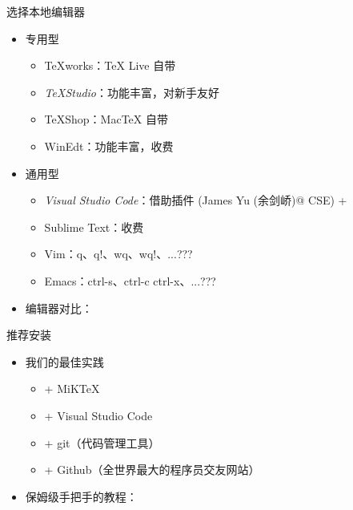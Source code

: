 \begin{frame}{选择本地编辑器}
    \begin{itemize}
      \item<+-> 专用型
    
        \begin{itemize}
          \item TeXworks：\TeX{} Live 自带 \faWindows{} \faApple{} \faLinux{}
          \item \emph{TeXStudio}：功能丰富，对新手友好 \faWindows{} \faApple{} \faLinux{}
          \item TeXShop：Mac\TeX{} 自带 \faApple{}
          \item WinEdt：功能丰富，收费 \faWindows{}
        \end{itemize}
    
      \item<+-> 通用型
    
        \begin{itemize}
          \item \emph{Visual Studio Code}：借助插件  (James Yu (余剑峤)@ CSE) + 
          \item Sublime Text：收费
          \item Vim：q、q!、wq、wq!、...???
          \item Emacs：ctrl-s、ctrl-c ctrl-x、...???
        \end{itemize}
  
      \item<+-> 编辑器对比：
    \end{itemize}
\end{frame}


\begin{frame}{推荐安装}
    \begin{itemize}
      \item<+-> 我们的最佳实践
    
        \begin{itemize}
            \item + MiK\TeX{}
            \item + Visual Studio Code
            \item + git（代码管理工具）
            \item + Github（全世界最大的程序员交友网站）
        \end{itemize}

      \item<+-> 保姆级手把手的教程：

    \end{itemize}
\end{frame}


